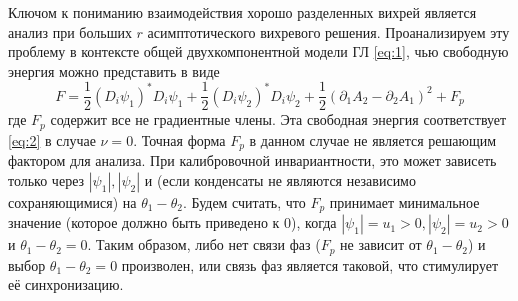 Ключом к пониманию взаимодействия хорошо разделенных вихрей является анализ 
при больших \( r \) асимптотического вихревого решения. Проанализируем эту 
проблему в контексте общей двухкомпонентной модели ГЛ \eqref{eq:1}, чью 
свободную энергия можно представить в виде
\begin{equation}
    F = \frac{1}{2}\left( D_i \psi_1 \right)^{*} D_i \psi_1 + 
        \frac{1}{2}\left( D_i \psi_2 \right)^{*} D_i \psi_2 + 
        \frac{1}{2}\left( \partial_1 A_2 - \partial_2 A_1 \right)^2 + F_p
    \label{eq:3}
\end{equation}
где \( F_p \) содержит все не градиентные члены. Эта свободная энергия 
соответствует \eqref{eq:2} в случае \( \nu = 0 \). Точная форма \( F_p \) в 
данном случае не является решающим фактором для анализа. При калибровочной 
инвариантности, это может зависеть только через \( |\psi_1|, |\psi_2| \) и 
(если конденсаты не являются независимо сохраняющимися) на 
\( \theta_1 - \theta_2 \). Будем считать, что \( F_p \) принимает минимальное 
значение (которое должно быть приведено к 0), когда 
\( |\psi_1| = u_1 > 0, |\psi_2| = u_2 > 0 \) и \( \theta_1 - \theta_2 = 0 \).
Таким образом, либо нет связи фаз (\( F_p \) не зависит от 
\( \theta_1 - \theta_2 \)) и выбор \( \theta_1 - \theta_2 = 0 \) произволен, 
или связь фаз является таковой, что стимулирует её синхронизацию. 

